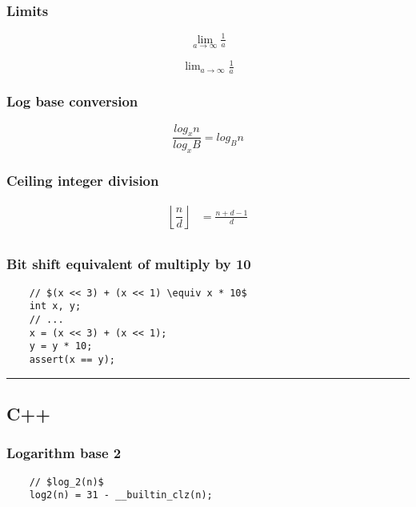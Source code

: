 \documentclass{article}
\begin{document}
\subsubsection{Limits}
\begin{equation}
    \lim_{a\to \infty} \tfrac{1}{a}
\end{equation}


\begin{equation}
    \lim\nolimits_{a\to \infty} \tfrac{1}{a}
\end{equation}

\subsubsection{Log base conversion}
\begin{equation*}
    \frac{log_xn}{log_xB} = log_Bn
\end{equation*}

\subsubsection{Ceiling integer division}
\begin{align*}
    \left\lfloor\dfrac{n}{d}\right\rfloor & = \frac{n + d - 1}{d} \\
\end{align*}

\subsubsection{Bit shift equivalent of multiply by 10}
\begin{verbatim}
    // $(x << 3) + (x << 1) \equiv x * 10$
    int x, y;
    // ...
    x = (x << 3) + (x << 1);
    y = y * 10;
    assert(x == y);
\end{verbatim}

\noindent\rule{\textwidth}{1pt}

\subsection{C++}
\subsubsection{Logarithm base 2}

\begin{verbatim}
    // $log_2(n)$
    log2(n) = 31 - __builtin_clz(n);
\end{verbatim}
\end{document}
